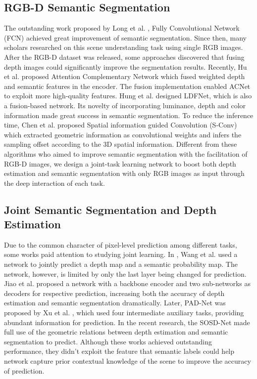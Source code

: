 \documentclass[sn-mathphys]{sn-jnl}
\theoremstyle{thmstyleone}\newtheorem{theorem}{Theorem}\newtheorem{proposition}[theorem]{Proposition}
\theoremstyle{thmstyletwo}\newtheorem{example}{Example}\newtheorem{remark}{Remark}
\theoremstyle{thmstylethree}\newtheorem{definition}{Definition}\usepackage[numbers,sort&compress]{natbib}
\begin{document}
\subsection{RGB-D Semantic Segmentation}
The outstanding work proposed by Long et al. \cite{Long_2015}, Fully Convolutional Network (FCN) achieved great improvement of semantic segmentation. Since then, many scholars \cite{Yuan_2020,Yuan_2021,Yu_2020,Lin_2016,kendall2015bayesian} researched on this scene understanding task using single RGB images. After the RGB-D dataset was released, some approaches \cite{Qi_2017,Hazirbas_2017,He_2017} discovered that fusing depth images could significantly improve the segmentation results. Recently, Hu et al.\cite{Hu_2019_AcNet} proposed Attention Complementary Network which fused weighted depth and semantic features in the encoder. The fusion implementation enabled ACNet to exploit more high-quality features. Hung et al.\cite{Hung_2019} designed LDFNet, which is also a fusion-based network. Its novelty of incorporating luminance, depth and color information made great success in semantic segmentation. To reduce the inference time, Chen et al.\cite{Chen_2021_Spatial} proposed Spatial information guided Convolution (S-Conv) which extracted geometric information as convolutional weights and infers the sampling offset according to the 3D spatial information. Different from these algorithms who aimed to improve semantic segmentation with the facilitation of RGB-D images, we design a joint-task learning network to boost both depth estimation and semantic segmentation with only RGB images as input through the deep interaction of each task.

\subsection{Joint Semantic Segmentation and Depth Estimation}
Due to the common character of pixel-level prediction among different tasks, some works paid attention to studying joint learning. In \cite{Peng_Wang_2015}, Wang et al. used a network to jointly predict a depth map and a semantic probability map. The network, however, is limited by only the last layer being changed for prediction. Jiao et al. \cite{Jiao_2018} proposed a network with a backbone encoder and two sub-networks as decoders for respective prediction, increasing both the accuracy of depth estimation and semantic segmentation dramatically. Later, PAD-Net was proposed by Xu et al. \cite{Xu_2018_Pad}, which used four intermediate auxiliary tasks, providing abundant information for prediction. In the recent research, the SOSD-Net \cite{He_2021} made full use of the geometric relations between depth estimation and semantic segmentation to predict. Although these works achieved outstanding performance, they didn't exploit the feature that semantic labels could help network capture prior contextual knowledge of the scene to improve the accuracy of prediction.
\end{document}
